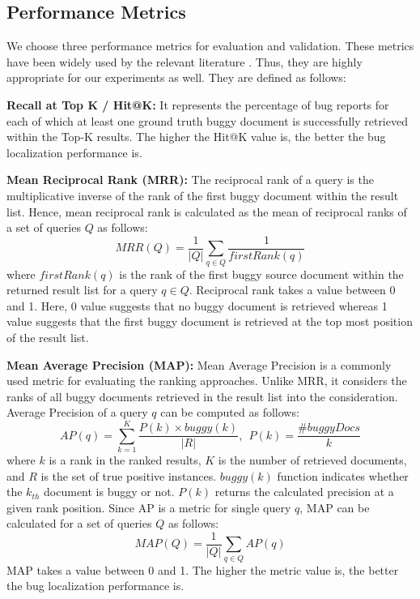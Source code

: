 \documentclass[sigconf,review,anonymous]{acmart}
\begin{document}
\subsection{Performance Metrics}\label{sec:pmetrics}
We choose three performance metrics for evaluation and validation. These metrics have been widely used by the relevant literature \cite{Jian, Saha}. Thus, they are highly appropriate for our experiments as well. They are defined as follows:

\textbf{Recall at Top K / Hit@K:} It represents the percentage of bug reports for each of which at least one ground truth buggy document is successfully retrieved within the Top-K results. 
The higher the Hit@K value is, the better the bug localization performance is.

\textbf{Mean Reciprocal Rank (MRR):}
The reciprocal rank of a query is the multiplicative inverse of the rank of the first buggy document within the result list. Hence, mean reciprocal rank is calculated as the mean of reciprocal ranks of a set of queries $Q$ as follows:
\begin{equation*}
MRR(Q) = \frac{1}{\left | Q \right |}\sum_{q\in Q}\frac{1}{firstRank(q)}
\end{equation*}
where $firstRank(q)$ is the rank of the first buggy source document within the returned result list for a query $q\in Q$. Reciprocal rank takes a value between 0 and 1. Here, 0 value suggests that no buggy document is retrieved whereas 1 value suggests that the first buggy document is retrieved at the top most position of the result list.

\textbf{Mean Average Precision (MAP):}
Mean Average Precision is a commonly used metric for evaluating the ranking approaches. Unlike MRR, it considers the ranks of all buggy documents retrieved in the result list into the consideration. 
Average Precision of a query $q$ can be computed as follows:
\begin{equation*}
AP(q)=\sum_{k=1}^{K}\frac{P(k)\times buggy(k)}{|R|},~~P(k)=\frac{\#buggyDocs}{k}
\end{equation*}
where $k$ is a rank in the ranked results, $K$ is the number of retrieved documents, and $R$ is the set of true positive instances. $buggy(k)$ function indicates whether the $k_{th}$ document is buggy or not. $P(k)$ returns the calculated precision at a given rank position. Since AP is a metric for single query $q$, MAP can be calculated for a set of queries $Q$ as follows:
\begin{equation*}
MAP(Q) = \frac{1}{|Q|}\sum_{q\in Q}AP(q)
\end{equation*}
MAP takes a value between 0 and 1. The higher the metric value is, the better the bug localization performance is.
\end{document}
